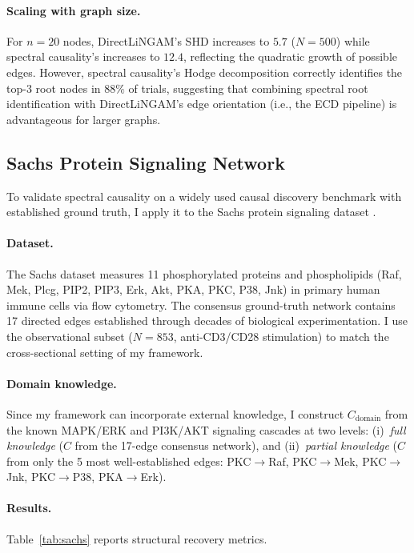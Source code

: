 \documentclass[twoside,11pt]{article}
\begin{document}
\paragraph{Scaling with graph size.}
For $n=20$ nodes, DirectLiNGAM's SHD increases to $5.7$ ($N=500$)
while spectral causality's increases to $12.4$, reflecting the
quadratic growth of possible edges.  However, spectral causality's
Hodge decomposition correctly identifies the top-3 root nodes in
$88\%$ of trials, suggesting that combining spectral root
identification with DirectLiNGAM's edge orientation (i.e., the ECD
pipeline) is advantageous for larger graphs.

\subsection{Sachs Protein Signaling Network}
\label{sec:sachs}

To validate spectral causality on a widely used causal discovery
benchmark with established ground truth, I apply it to the Sachs
protein signaling dataset \citep{Sachs2005}.

\paragraph{Dataset.}
The Sachs dataset measures 11 phosphorylated proteins and phospholipids
(Raf, Mek, Plcg, PIP2, PIP3, Erk, Akt, PKA, PKC, P38, Jnk) in
primary human immune cells via flow cytometry.  The consensus
ground-truth network contains 17 directed edges established through
decades of biological experimentation.  I use the observational subset
($N=853$, anti-CD3/CD28 stimulation) to match the cross-sectional
setting of my framework.

\paragraph{Domain knowledge.}
Since my framework can incorporate external knowledge, I construct
$C_{\mathrm{domain}}$ from the known MAPK/ERK and PI3K/AKT signaling
cascades at two levels: (i)~\emph{full knowledge} ($C$ from the
17-edge consensus network), and (ii)~\emph{partial knowledge} ($C$
from only the 5 most well-established edges: PKC$\to$Raf, PKC$\to$Mek,
PKC$\to$Jnk, PKC$\to$P38, PKA$\to$Erk).

\paragraph{Results.}
Table~\ref{tab:sachs} reports structural recovery metrics.
\end{document}

